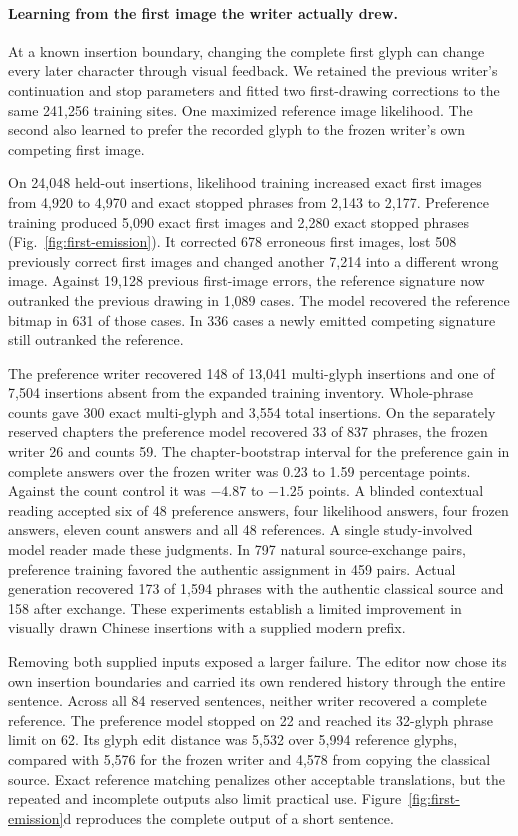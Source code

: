 \documentclass[12pt,a4paper]{article}
\providecommand{\DIFadd}[1]{{\protect\color{blue} \sf #1}} %
\begin{document}
\paragraph{\DIFadd{Learning from the first image the writer actually drew.}}
\DIFadd{At a known insertion boundary, changing the complete first glyph can change every later character through visual feedback. We retained the previous writer's continuation and stop parameters and fitted two first-drawing corrections to the same 241,256 training sites. One maximized reference image likelihood. The second also learned to prefer the recorded glyph to the frozen writer's own competing first image.
}

\DIFadd{On 24,048 held-out insertions, likelihood training increased exact first images from 4,920 to 4,970 and exact stopped phrases from 2,143 to 2,177. Preference training produced 5,090 exact first images and 2,280 exact stopped phrases (Fig.~\ref{fig:first-emission}). It corrected 678 erroneous first images, lost 508 previously correct first images and changed another 7,214 into a different wrong image. Against 19,128 previous first-image errors, the reference signature now outranked the previous drawing in 1,089 cases. The model recovered the reference bitmap in 631 of those cases. In 336 cases a newly emitted competing signature still outranked the reference.
}

\DIFadd{The preference writer recovered 148 of 13,041 multi-glyph insertions and one of 7,504 insertions absent from the expanded training inventory. Whole-phrase counts gave 300 exact multi-glyph and 3,554 total insertions. On the separately reserved chapters the preference model recovered 33 of 837 phrases, the frozen writer 26 and counts 59. The chapter-bootstrap interval for the preference gain in complete answers over the frozen writer was 0.23 to 1.59 percentage points. Against the count control it was $-4.87$ to $-1.25$ points. A blinded contextual reading accepted six of 48 preference answers, four likelihood answers, four frozen answers, eleven count answers and all 48 references. A single study-involved model reader made these judgments. In 797 natural source-exchange pairs, preference training favored the authentic assignment in 459 pairs. Actual generation recovered 173 of 1,594 phrases with the authentic classical source and 158 after exchange. These experiments establish a limited improvement in visually drawn Chinese insertions with a supplied modern prefix.
}

\DIFadd{Removing both supplied inputs exposed a larger failure. The editor now chose its own insertion boundaries and carried its own rendered history through the entire sentence. Across all 84 reserved sentences, neither writer recovered a complete reference. The preference model stopped on 22 and reached its 32-glyph phrase limit on 62. Its glyph edit distance was 5,532 over 5,994 reference glyphs, compared with 5,576 for the frozen writer and 4,578 from copying the classical source. Exact reference matching penalizes other acceptable translations, but the repeated and incomplete outputs also limit practical use. Figure~\ref{fig:first-emission}d reproduces the complete output of a short sentence.
}
\end{document}
